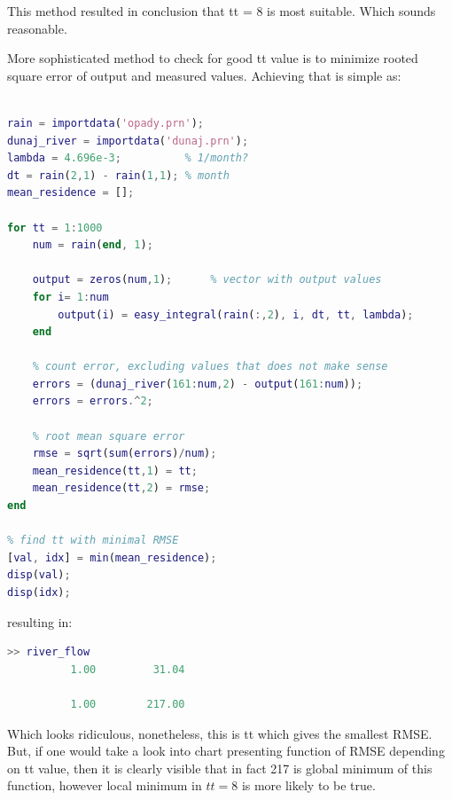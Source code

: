 \documentclass[onecolumn]{article}
\begin{document}
This method resulted in conclusion that tt = 8 is most suitable. Which sounds reasonable.

More sophisticated method to check for good tt value is to minimize rooted square error of output and measured values. Achieving that is simple as:
\begin{lstlisting}[language=Matlab,frame=single,label={lst:autocorr},breaklines=true,caption={Convolutional integral implementation with exponential transit function}]

rain = importdata('opady.prn');
dunaj_river = importdata('dunaj.prn');
lambda = 4.696e-3;          % 1/month?
dt = rain(2,1) - rain(1,1); % month
mean_residence = [];

for tt = 1:1000
    num = rain(end, 1);

    output = zeros(num,1);      % vector with output values
    for i= 1:num
        output(i) = easy_integral(rain(:,2), i, dt, tt, lambda);
    end
    
    % count error, excluding values that does not make sense
    errors = (dunaj_river(161:num,2) - output(161:num));
    errors = errors.^2;
    
    % root mean square error
    rmse = sqrt(sum(errors)/num);
    mean_residence(tt,1) = tt;
    mean_residence(tt,2) = rmse;
end

% find tt with minimal RMSE
[val, idx] = min(mean_residence);
disp(val);
disp(idx);
\end{lstlisting}

\newpage
resulting in:
\begin{lstlisting}[language=Matlab,frame=single,label={lst:autocorr},breaklines=true,caption={Convolutional integral implementation with exponential transit function}]
>> river_flow
          1.00         31.04

          1.00        217.00
\end{lstlisting}
Which looks ridiculous, nonetheless, this is tt which gives the smallest RMSE. But, if one would take a look into chart presenting function of RMSE depending on tt value, then it is clearly visible that in fact 217 is global minimum of this function, however local minimum in 
$tt = 8$ is more likely to be true. \\
\noindent{}
\end{document}
